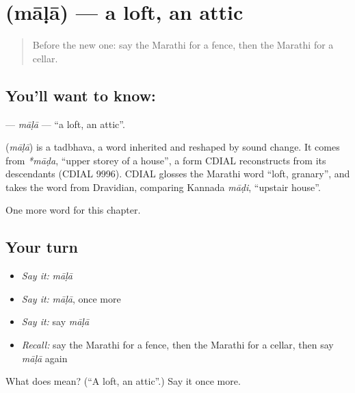 \section[\texorpdfstring{\mr{माळा} (māḷā)}{माळा (māḷā)}]{ (māḷā) — a loft, an attic}

\label{lesson:MR-C213-mala}



\begin{quote}
Before the new one: say the Marathi for a fence, then the Marathi for a cellar.
\end{quote}

\subsection*{You'll want to know: }
\textbf{} — \emph{māḷā} — \textquotedblleft{}a loft, an attic\textquotedblright{}.

\begin{cousinweb}
\textbf{} (\emph{māḷā}) is a tadbhava, a word inherited and reshaped by sound change. It comes from \emph{*māḍa}, \textquotedblleft{}upper storey of a house\textquotedblright{}, a form CDIAL reconstructs from its descendants (CDIAL 9996). CDIAL glosses the Marathi word \textquotedblleft{}loft, granary\textquotedblright{}, and takes the word from Dravidian, comparing Kannada \emph{māḍi}, \textquotedblleft{}upstair house\textquotedblright{}.
\end{cousinweb}

\begin{grammarlens}[title={What you've built}]
One more word for this chapter.
\end{grammarlens}

\subsection*{Your turn}
\begin{itemize}
\raggedright
  \item \emph{Say it:} \emph{māḷā}
  \item \emph{Say it:} \emph{māḷā}, once more
  \item \emph{Say it:} say \emph{māḷā}
  \item \emph{Recall:} say the Marathi for a fence, then the Marathi for a cellar, then say \emph{māḷā} again
\end{itemize}

\begin{tcolorbox}[breakable,colback=teal!4,colframe=teal!35!black,title={Before you move on}]
What does  mean? (\textquotedblleft{}A loft, an attic\textquotedblright{}.) Say it once more.
\end{tcolorbox}
